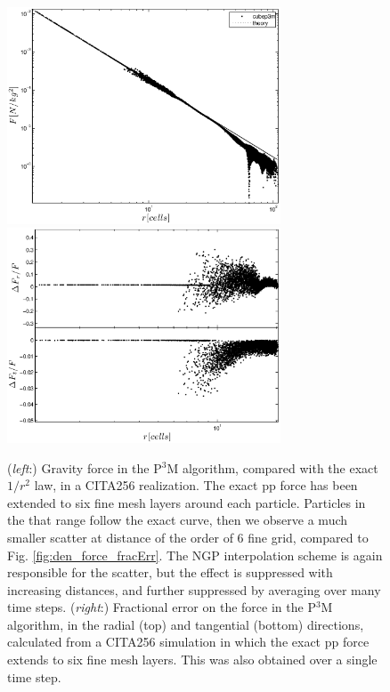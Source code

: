  \begin{figure}%
  \begin{center}
    \includegraphics[width=3.2in]{graphs/densityForce_ppext=6.eps}
    \includegraphics[width=3.2in]{graphs/densityForce_fracErr_ppext=6.eps}
    \caption{({\it left}:) Gravity force in the P$^3$M algorithm, compared with the exact $1/r^{2}$ law,
  in a CITA256 realization. The exact pp force has been extended to six fine mesh layers around each particle.
  Particles in the that range follow the exact curve, then we observe a much smaller scatter at 
  distance of the order of 6 fine grid, compared to Fig. \ref{fig:den_force_fracErr}. 
  The NGP interpolation scheme is again responsible for the scatter, but the effect is suppressed with increasing distances, and further suppressed by averaging over many time steps.
  ({\it right}:) Fractional error on the force in the P$^3$M algorithm, in the radial (top) and tangential (bottom) directions,
  calculated from a CITA256 simulation in which the exact pp force extends to six fine mesh layers. 
  This was also obtained over a single time step.
    \label{fig:den_force_fracErr_ppext6}}
\end{center}
\end{figure}

